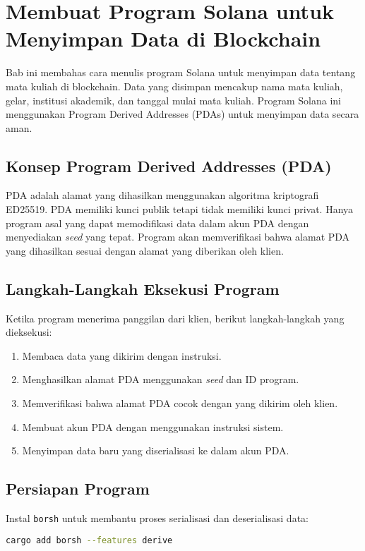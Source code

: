 \chapter{Membuat Program Solana untuk Menyimpan Data di Blockchain}

Bab ini membahas cara menulis program Solana untuk menyimpan data tentang mata kuliah di blockchain. Data yang disimpan mencakup nama mata kuliah, gelar, institusi akademik, dan tanggal mulai mata kuliah. Program Solana ini menggunakan Program Derived Addresses (PDAs) untuk menyimpan data secara aman.

\section{Konsep Program Derived Addresses (PDA)}
PDA adalah alamat yang dihasilkan menggunakan algoritma kriptografi ED25519. PDA memiliki kunci publik tetapi tidak memiliki kunci privat. Hanya program asal yang dapat memodifikasi data dalam akun PDA dengan menyediakan \textit{seed} yang tepat. Program akan memverifikasi bahwa alamat PDA yang dihasilkan sesuai dengan alamat yang diberikan oleh klien.

\section{Langkah-Langkah Eksekusi Program}
Ketika program menerima panggilan dari klien, berikut langkah-langkah yang dieksekusi:
\begin{enumerate}
	\item Membaca data yang dikirim dengan instruksi.
	\item Menghasilkan alamat PDA menggunakan \textit{seed} dan ID program.
	\item Memverifikasi bahwa alamat PDA cocok dengan yang dikirim oleh klien.
	\item Membuat akun PDA dengan menggunakan instruksi sistem.
	\item Menyimpan data baru yang diserialisasi ke dalam akun PDA.
\end{enumerate}

\section{Persiapan Program}
Instal \texttt{borsh} untuk membantu proses serialisasi dan deserialisasi data:

\begin{lstlisting}[language=bash]
	cargo add borsh --features derive
\end{lstlisting}

